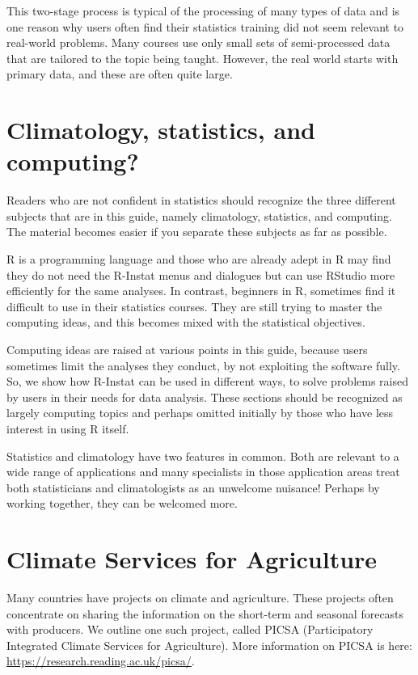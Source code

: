 \documentclass[
  letterpaper,
  DIV=11,
  numbers=noendperiod]{scrreprt}
\begin{document}
This two-stage process is typical of the processing of many types of
data and is one reason why users often find their statistics training
did not seem relevant to real-world problems. Many courses use only
small sets of semi-processed data that are tailored to the topic being
taught. However, the real world starts with primary data, and these are
often quite large.

\section{Climatology, statistics, and
computing?}\label{climatology-statistics-and-computing}

Readers who are not confident in statistics should recognize the three
different subjects that are in this guide, namely climatology,
statistics, and computing. The material becomes easier if you separate
these subjects as far as possible.

R is a programming language and those who are already adept in R may
find they do not need the R-Instat menus and dialogues but can use
RStudio more efficiently for the same analyses. In contrast, beginners
in R, sometimes find it difficult to use in their statistics courses.
They are still trying to master the computing ideas, and this becomes
mixed with the statistical objectives.

Computing ideas are raised at various points in this guide, because
users sometimes limit the analyses they conduct, by not exploiting the
software fully. So, we show how R-Instat can be used in different ways,
to solve problems raised by users in their needs for data analysis.
These sections should be recognized as largely computing topics and
perhaps omitted initially by those who have less interest in using R
itself.

Statistics and climatology have two features in common. Both are
relevant to a wide range of applications and many specialists in those
application areas treat both statisticians and climatologists as an
unwelcome nuisance! Perhaps by working together, they can be welcomed
more.

\section{Climate Services for
Agriculture}\label{climate-services-for-agriculture}

Many countries have projects on climate and agriculture. These projects
often concentrate on sharing the information on the short-term and
seasonal forecasts with producers. We outline one such project, called
PICSA (Participatory Integrated Climate Services for Agriculture). More
information on PICSA is here:
\href{https://research.reading.ac.uk/picsa/}{\ul{https://research.reading.ac.uk/picsa/}}.
\end{document}
